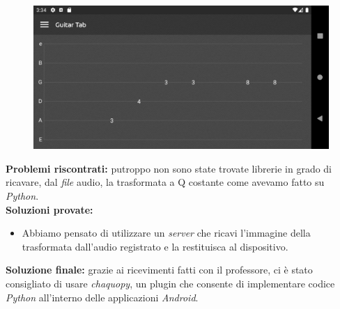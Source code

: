 \begin{figure}[H]
	\centering
	\includegraphics[scale=0.15]{./images/img19.png}
\end{figure}
\textbf{Problemi riscontrati:} putroppo non sono state trovate librerie in grado di ricavare, dal \textit{file} audio, la trasformata a Q costante come avevamo fatto su \textit{Python}.\\
\newline
%
\textbf{Soluzioni provate:}
\begin{itemize}
	\item Abbiamo pensato di utilizzare un \textit{server} che ricavi l'immagine della trasformata dall'audio registrato e la restituisca al dispositivo.\\
\end{itemize}
%
\textbf{Soluzione finale:} grazie ai ricevimenti fatti con il professore, ci è stato consigliato di usare \textit{chaquopy}, un plugin che consente di implementare codice \textit{Python} all'interno delle applicazioni \textit{Android}.

